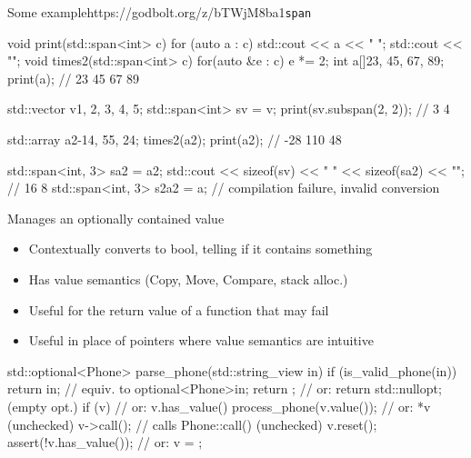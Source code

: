 \begin{frame}[fragile]
  \begin{exampleblockGB}{Some example}{https://godbolt.org/z/bTWjM8ba1}{\texttt{span}}
    \scriptsize
    \begin{cppcode*}{}
      void print(std::span<int> c) {
        for (auto a : c) { std::cout << a << " "; }
        std::cout << "\n";
      }
      void times2(std::span<int> c) {
        for(auto &e : c) { e *= 2; }
      }
      int a[]{23, 45, 67, 89};
      print(a);                 // 23 45 67 89

      std::vector v{1, 2, 3, 4, 5};
      std::span<int> sv = v;
      print(sv.subspan(2, 2));  // 3 4

      std::array a2{-14, 55, 24};
      times2(a2);
      print(a2);                // -28 110 48

      std::span<int, 3> sa2 = a2;
      std::cout << sizeof(sv) << " " << sizeof(sa2) << "\n";  // 16 8
      std::span<int, 3> s2a2 = a; // compilation failure, invalid conversion
    \end{cppcode*}
  \end{exampleblockGB}
\end{frame}

\begin{frame}[fragile]
  \begin{block}{Manages an optionally contained value}
    \begin{itemize}
    \item Contextually converts to bool, telling if it contains something
    \item Has value semantics (Copy, Move, Compare, stack alloc.)
    \item Useful for the return value of a function that may fail
    \item Useful in place of pointers where value semantics are intuitive
    \end{itemize}
  \end{block}
  \begin{exampleblock}{}
    \small
    \begin{cppcode*}{}
      std::optional<Phone> parse_phone(std::string_view in) {
        if (is_valid_phone(in))
          return in; // equiv. to optional<Phone>{in};
        return {};   // or: return std::nullopt; (empty opt.)
      }
      if (v) {                    // or: v.has_value()
        process_phone(v.value()); // or: *v (unchecked)
        v->call(); // calls Phone::call()   (unchecked)
      }
      v.reset(); assert(!v.has_value()); // or: v = {};
    \end{cppcode*}
  \end{exampleblock}
\end{frame}

